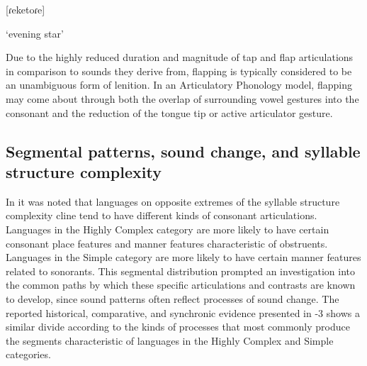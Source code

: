 [ɾeketoɾe]

\glt ‘evening star’

\citep[6]{Dutton1996}

\z

  Due to the highly reduced duration and magnitude of tap and flap articulations in comparison to sounds they derive from, flapping is typically considered to be an unambiguous form of lenition. In an Articulatory Phonology model, flapping may come about through both the overlap of surrounding vowel gestures into the consonant and the reduction of the tongue tip or active articulator gesture. 

\subsection{Segmental patterns, sound change, and syllable structure complexity}\label{sec:4.5.4}

  In  it was noted that languages on opposite extremes of the syllable structure complexity cline tend to have different kinds of consonant articulations. Languages in the Highly Complex category are more likely to have certain consonant place features and manner features characteristic of obstruents. Languages in the Simple category are more likely to have certain manner features related to sonorants. This segmental distribution prompted an investigation into the common paths by which these specific articulations and contrasts are known to develop, since sound patterns often reflect processes of sound change. The reported historical, comparative, and synchronic evidence presented in -3 shows a similar divide according to the kinds of processes that most commonly produce the segments characteristic of languages in the Highly Complex and Simple categories.

